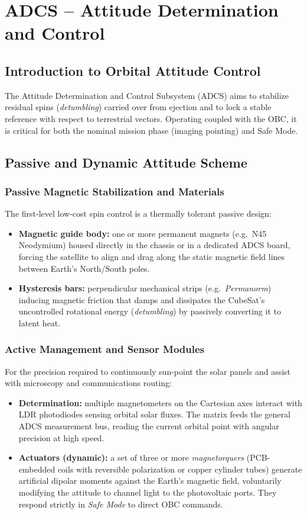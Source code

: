 \chapter{ADCS – Attitude Determination and Control}

\section{Introduction to Orbital Attitude Control}
The Attitude Determination and Control Subsystem (ADCS) aims to stabilize residual spins (\textit{detumbling}) carried over from ejection and to lock a stable reference with respect to terrestrial vectors. Operating coupled with the OBC, it is critical for both the nominal mission phase (imaging pointing) and Safe Mode.

\section{Passive and Dynamic Attitude Scheme}

\subsection{Passive Magnetic Stabilization and Materials}
The first-level low-cost spin control is a thermally tolerant passive design:
\begin{itemize}
    \item \textbf{Magnetic guide body:} one or more permanent magnets (e.g.\ N45 Neodymium) housed directly in the chassis or in a dedicated ADCS board, forcing the satellite to align and drag along the static magnetic field lines between Earth's North/South poles.
    \item \textbf{Hysteresis bars:} perpendicular mechanical strips (e.g.\ \textit{Permanorm}) inducing magnetic friction that damps and dissipates the CubeSat's uncontrolled rotational energy (\textit{detumbling}) by passively converting it to latent heat.
\end{itemize}

\subsection{Active Management and Sensor Modules}
For the precision required to continuously sun-point the solar panels and assist with microscopy and communications routing:
\begin{itemize}
    \item \textbf{Determination:} multiple magnetometers on the Cartesian axes interact with LDR photodiodes sensing orbital solar fluxes. The matrix feeds the general ADCS measurement bus, reading the current orbital point with angular precision at high speed.
    \item \textbf{Actuators (dynamic):} a set of three or more \textit{magnetorquers} (PCB-embedded coils with reversible polarization or copper cylinder tubes) generate artificial dipolar moments against the Earth's magnetic field, voluntarily modifying the attitude to channel light to the photovoltaic ports. They respond strictly in \textit{Safe Mode} to direct OBC commands.
\end{itemize}
